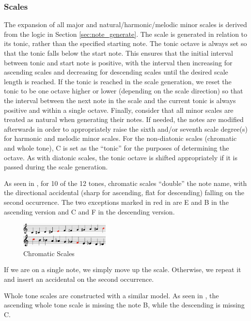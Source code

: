\documentclass{article}
\begin{document}
\subsubsection{Scales}
The expansion of all major and natural/harmonic/melodic minor scales is derived from the logic in Section \ref{sec:note_generate}. The scale is generated in relation to its tonic, rather than the specified starting note. The tonic octave is always set so that the tonic falls below the start note. This ensures that the initial interval between tonic and start note is positive, with the interval then increasing for ascending scales and decreasing for descending scales until the desired scale length is reached. If the tonic is reached in the scale generation, we reset the tonic to be one octave higher or lower (depending on the scale direction) so that the interval between the next note in the scale and the current tonic is always positive and within a single octave. Finally, consider that all minor scales are treated as natural when generating their notes. If needed, the notes are modified afterwards in order to appropriately raise the sixth and/or seventh scale degree(s) for harmonic and melodic minor scales. For the non-diatonic scales (chromatic and whole tone), C is set as the “tonic” for the purposes of determining the octave. As with diatonic scales, the tonic octave is shifted appropriately if it is passed during the scale generation.

As seen in , for 10 of the 12 tones, chromatic scales “double” the note name, with the directional accidental (sharp for ascending, flat for descending) falling on the second occurrence. The two exceptions marked in red in  are E and B in the ascending version and C and F in the descending version.
\vspace{-2mm}
\begin{figure}[h!]
\centering
\includegraphics[width=0.4\textwidth]{images/chromatic}
\caption{Chromatic Scales}
\label{chromatic}
\vspace{-3mm}
\end{figure}

If we are on a single note, we simply move up the scale. Otherwise, we repeat it and insert an accidental on the second occurrence.

Whole tone scales are constructed with a similar model. As seen in , the ascending whole tone scale is missing the note B, while the descending is missing C.
\end{document}
